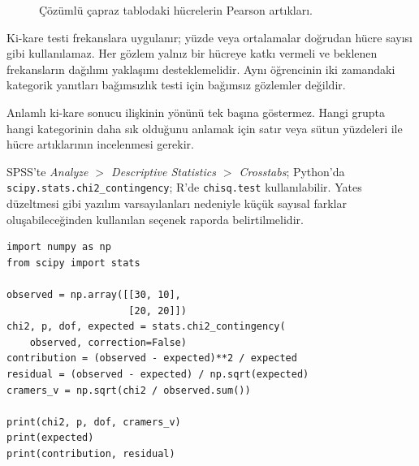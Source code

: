 \begin{figure}[H]
\centering
{}
\caption{Çözümlü çapraz tablodaki hücrelerin Pearson artıkları.}
\label{fig:chi-residuals}
\end{figure}

\begin{assumptionbox}
Ki-kare testi frekanslara uygulanır; yüzde veya ortalamalar doğrudan hücre
sayısı gibi kullanılamaz. Her gözlem yalnız bir hücreye katkı vermeli ve
beklenen frekansların dağılımı yaklaşımı desteklemelidir. Aynı öğrencinin iki
zamandaki kategorik yanıtları bağımsızlık testi için bağımsız gözlemler değildir.
\end{assumptionbox}

\begin{mistakebox}
Anlamlı ki-kare sonucu ilişkinin yönünü tek başına göstermez. Hangi grupta
hangi kategorinin daha sık olduğunu anlamak için satır veya sütun yüzdeleri
ile hücre artıklarının incelenmesi gerekir.
\end{mistakebox}

\begin{softwarebox}
SPSS'te \emph{Analyze $>$ Descriptive Statistics $>$ Crosstabs}; Python'da
\texttt{scipy.stats.chi2\_contingency}; R'de \texttt{chisq.test} kullanılabilir.
Yates düzeltmesi gibi yazılım varsayılanları nedeniyle küçük sayısal farklar
oluşabileceğinden kullanılan seçenek raporda belirtilmelidir.

\begin{lstlisting}
import numpy as np
from scipy import stats

observed = np.array([[30, 10],
                     [20, 20]])
chi2, p, dof, expected = stats.chi2_contingency(
    observed, correction=False)
contribution = (observed - expected)**2 / expected
residual = (observed - expected) / np.sqrt(expected)
cramers_v = np.sqrt(chi2 / observed.sum())

print(chi2, p, dof, cramers_v)
print(expected)
print(contribution, residual)
\end{lstlisting}
\end{softwarebox}

